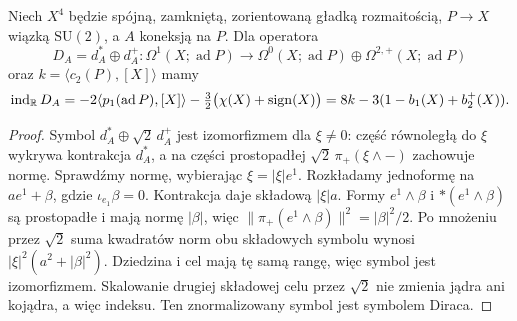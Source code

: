 \begin{twierdzenie}
\label{thm:hodge-asd-index}
Niech \(X^4\) będzie spójną, zamkniętą, zorientowaną
gładką rozmaitością, \(P\to X\) wiązką
\(\mathrm{SU}(2)\), a \(A\) koneksją na \(P\).
Dla operatora
\[
 D_A=d_A^*\oplus d_A^+:
 \Omega^1(X;\operatorname{ad}P)\longrightarrow
 \Omega^0(X;\operatorname{ad}P)\oplus
 \Omega^{2,+}(X;\operatorname{ad}P)
\]
oraz \(k=\langle c_2(P),[X]\rangle\) mamy
\begin{equation}\label{eq:hodge-asd-index}
 \operatorname{ind}_{\mathbb{R}}D_A
 =-2\langle p_1(\operatorname{ad}P),[X]\rangle
   -\tfrac32\bigl(\chi(X)+\operatorname{sign}(X)\bigr)
 =8k-3(1-b_1(X)+b_2^+(X)).
\end{equation}
\end{twierdzenie}
\begin{proof}
Symbol \(d_A^*\oplus\sqrt2\,d_A^+\)
jest izomorfizmem dla \(\xi\ne0\):
część równoległą do \(\xi\) wykrywa
kontrakcja \(d_A^*\), a na części
prostopadłej \(\sqrt2\,\pi_+(\xi\wedge-)\)
zachowuje normę.
Sprawdźmy normę, wybierając $\xi=|\xi|e^1$.
Rozkładamy jednoformę na $a e^1+\beta$, gdzie
$\iota_{e_1}\beta=0$.
Kontrakcja daje składową $|\xi|a$.
Formy $e^1\wedge\beta$ i $*(e^1\wedge\beta)$
są prostopadłe i mają normę $|\beta|$,
więc $\|\pi_+(e^1\wedge\beta)\|^2=|\beta|^2/2$.
Po mnożeniu przez $\sqrt2$ suma kwadratów norm
obu składowych symbolu wynosi
$|\xi|^2(a^2+|\beta|^2)$.
Dziedzina i cel mają tę samą rangę,
więc symbol jest izomorfizmem.
Skalowanie drugiej
składowej celu przez \(\sqrt2\)
nie zmienia jądra ani kojądra, a więc
indeksu. Ten znormalizowany symbol
jest symbolem Diraca.


\end{proof}

